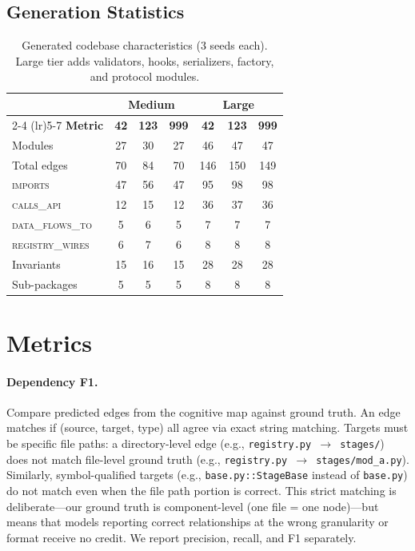 \documentclass{article}
\begin{document}
\subsection{Generation Statistics}

\begin{table}[!ht]
\centering
\caption{Generated codebase characteristics (3 seeds each). Large tier adds validators, hooks, serializers, factory, and protocol modules.}
\label{tab:codebases}
\begin{tabular}{@{}lcccccc@{}}
\toprule
 & \multicolumn{3}{c}{\textbf{Medium}} & \multicolumn{3}{c}{\textbf{Large}} \\
\cmidrule(lr){2-4} \cmidrule(lr){5-7}
\textbf{Metric} & \textbf{42} & \textbf{123} & \textbf{999} & \textbf{42} & \textbf{123} & \textbf{999} \\
\midrule
Modules & 27 & 30 & 27 & 46 & 47 & 47 \\
Total edges & 70 & 84 & 70 & 146 & 150 & 149 \\
\quad \textsc{imports} & 47 & 56 & 47 & 95 & 98 & 98 \\
\quad \textsc{calls\_api} & 12 & 15 & 12 & 36 & 37 & 36 \\
\quad \textsc{data\_flows\_to} & 5 & 6 & 5 & 7 & 7 & 7 \\
\quad \textsc{registry\_wires} & 6 & 7 & 6 & 8 & 8 & 8 \\
Invariants & 15 & 16 & 15 & 28 & 28 & 28 \\
Sub-packages & 5 & 5 & 5 & 8 & 8 & 8 \\
\bottomrule
\end{tabular}
\end{table}

\section{Metrics}
\label{sec:metrics}

\paragraph{Dependency F1.}
Compare predicted edges from the cognitive map against ground truth. An edge matches if (source, target, type) all agree via exact string matching. Targets must be specific file paths: a directory-level edge (e.g., \texttt{registry.py $\to$ stages/}) does not match file-level ground truth (e.g., \texttt{registry.py $\to$ stages/mod\_a.py}). Similarly, symbol-qualified targets (e.g., \texttt{base.py::StageBase} instead of \texttt{base.py}) do not match even when the file path portion is correct. This strict matching is deliberate---our ground truth is component-level (one file = one node)---but means that models reporting correct relationships at the wrong granularity or format receive no credit. We report precision, recall, and F1 separately.
\end{document}
